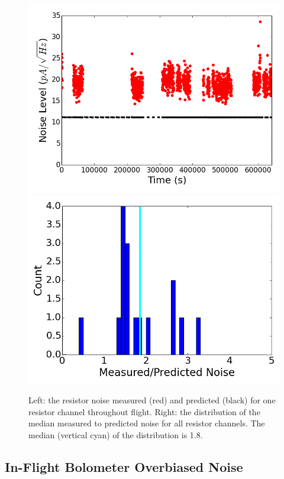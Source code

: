 \begin{figure}[htp]
\begin{center}
\includegraphics[width=0.48\columnwidth]{figures/board59_wire3_ch13_noise_vs_time}
\includegraphics[width=0.48\columnwidth]{figures/resistor_noise_histogram.png}
\caption[Resistor noise versus time and histogram of all resistors' median noise]{Left: the resistor noise measured (red) and predicted (black) for one resistor channel throughout flight. Right: the distribution of the median measured to predicted noise for all resistor channels. The median (vertical cyan) of the distribution is 1.8. 
\label{fig:resistor_in_flight_noise} }
\end{center}
\end{figure}





\subsection{In-Flight Bolometer Overbiased Noise}
\label{sec:flight_overbias_noise}

